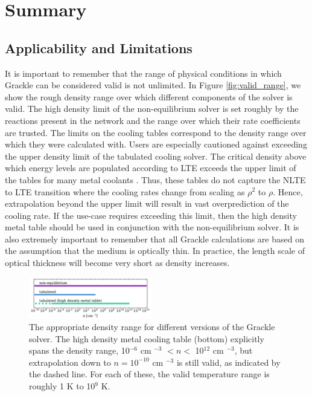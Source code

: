 \section{Summary} \label{sec:summary}

\subsection{Applicability and Limitations}

It is important to remember that the range of physical conditions in
which Grackle can be considered valid is not unlimited.  In Figure
\ref{fig:valid_range}, we show the rough density range over which
different components of the solver is valid.  The high density limit
of the non-equilibrium solver is set roughly by the reactions present
in the network and the range over which their rate coefficients are
trusted.  The limits on the cooling tables correspond to the density
range over which they were calculated with.  Users are especially
cautioned against exceeding the upper density limit of the tabulated
cooling solver.  The critical density above which energy levels are
populated according to LTE exceeds the upper limit of the tables for
many metal coolants \citep{2008MNRAS.385.1443S}.  Thus, these tables
do not capture the NLTE to LTE transition where the cooling rates
change from scaling as $\rho^{2}$ to $\rho$.  Hence, extrapolation
beyond the upper limit will result in vast overprediction of the
cooling rate.  If the use-case requires exceeding this limit, then the
high density metal table should be used in conjunction with the
non-equilibrium solver.  It is also extremely important to remember
that all Grackle calculations are based on the assumption that the
medium is optically thin.  In practice, the length scale of optical
thickness will become very short as density increases.

\begin{figure}
  \centering
  \includegraphics[width=0.48\textwidth]{valid_range.pdf}
  \caption{
    The appropriate density range for different versions of the
    Grackle solver.  The high density metal cooling table (bottom)
    explicitly spans the density range, 10$^{-6}$ cm $^{-3}$ $< n <$
    10$^{12}$ cm $^{-3}$, but extrapolation down to $n = 10^{-10}$ cm
    $^{-3}$ is still valid, as indicated by the dashed line.  For each
    of these, the valid temperature range is roughly 1 K to 10$^{9}$
    K.
  } \label{fig:valid-range}
\end{figure}

